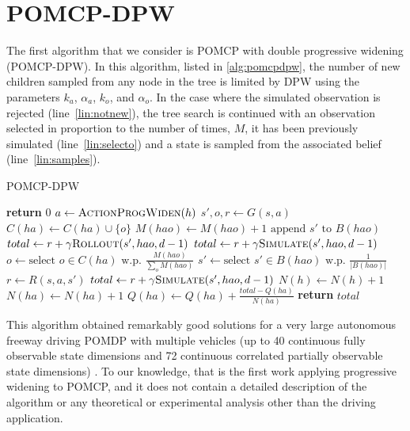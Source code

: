 \section{POMCP-DPW}

The first algorithm that we consider is POMCP with double progressive widening (POMCP-DPW).
In this algorithm, listed in \cref{alg:pomcpdpw}, the number of new children sampled from any node in the tree is limited by DPW using the parameters $k_a$, $\alpha_a$, $k_o$, and $\alpha_o$.
In the case where the simulated observation is rejected (line~\ref{lin:notnew}), the tree search is continued with an observation selected in proportion to the number of times, $M$, it has been previously simulated (line~\ref{lin:selecto}) and a state is sampled from the associated belief (line~\ref{lin:samples}).

\setcounter{algorithm}{0}
\begin{algorithm}
    \caption{POMCP-DPW} \label{alg:pomcpdpw}
    \begin{algorithmic}[1]
                \State \textbf{return} $0$
            \EndIf
            \State $a \gets \Call{ActionProgWiden}{h}$
                \State $s',o,r \gets G(s,a)$
                \State $C(ha) \gets C(ha) \cup \{o\}$
                \State $M(hao) \gets M(hao) + 1$
                \State $\text{append } s' \text{ to } B(hao)$ \label{lin:insertion}
                    \State $total \gets r + \gamma \Call{Rollout}{s', hao, d-1}$
                \Else
                    \State $total \gets r + \gamma \Call{Simulate}{s', hao, d-1}$
                \EndIf
            \Else \label{lin:notnew}
                \State $o \gets \text{select } o \in C(ha) \text{ w.p. } \frac{M(hao)}{\sum_{o} M(hao)}$ \label{lin:selecto}
                \State $s' \gets \text{select } s' \in B(hao) \text{ w.p. } \frac{1}{|B(hao)|}$ \label{lin:samples}
                \State $r \gets R(s,a,s')$
                \State $total \gets r + \gamma \Call{Simulate}{s', hao, d-1}$
            \EndIf
            \State $N(h) \gets N(h)+1$
            \State $N(ha) \gets N(ha)+1$
            \State $Q(ha) \gets Q(ha) + \frac{total - Q(ha)}{N(ha)}$
            \State \textbf{return} $total$
        \EndProcedure
    \end{algorithmic}
\end{algorithm}

This algorithm obtained remarkably good solutions for a very large autonomous freeway driving POMDP with multiple vehicles (up to 40 continuous fully observable state dimensions and 72 continuous correlated partially observable state dimensions) \cite{sunberg2017value}.
To our knowledge, that is the first work applying progressive widening to POMCP, and it does not contain a detailed description of the algorithm or any theoretical or experimental analysis other than the driving application.

